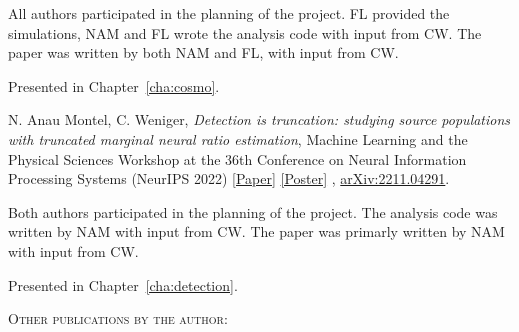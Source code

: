 \begin{itemize}[]
{{All authors participated in the planning of the project. FL provided the simulations, NAM and FL wrote the analysis code with input from CW. The paper was written by both NAM and FL, with input from CW.}   \vskip 5pt

Presented in Chapter~\ref{cha:cosmo}. \vskip 10pt


\item[\cite{AnauMontel:2022ppb}] 
{N. Anau Montel}, C. Weniger, \textit{Detection is truncation: studying source populations with truncated marginal neural ratio estimation}, Machine Learning and the Physical Sciences Workshop at the 36th Conference on Neural Information Processing Systems (NeurIPS 2022) \href{https://ml4physicalsciences.github.io/2022/files/NeurIPS_ML4PS_2022_50.pdf}{[Paper]} \href{https://neurips.cc/media/PosterPDFs/NeurIPS%202022/57017.png}{[Poster]} , \href{https://arxiv.org/abs/2211.04291}{\ttfamily arXiv:2211.04291}.  \vskip 5pt

{Both authors participated in the planning of the project. The analysis code was written by NAM with input from CW. The paper was primarly written by NAM with input from CW.}   \vskip 5pt

Presented in Chapter~\ref{cha:detection}. \vskip 10pt

}

\end{itemize}


{\scshape Other publications by the author:} \vskip 20pt

